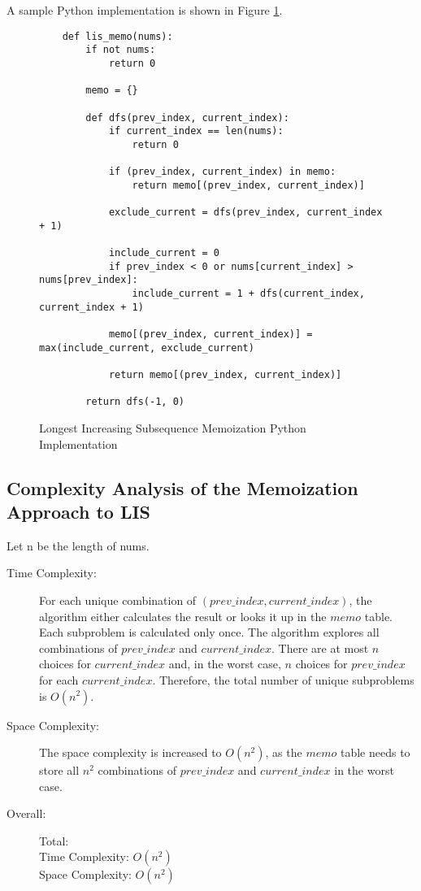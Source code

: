 A sample Python implementation is shown in Figure \ref{fig:lis-memo}.

\begin{figure}[H]
    \centering
    \begin{lstlisting}
    def lis_memo(nums):
        if not nums:
            return 0
    
        memo = {}
    
        def dfs(prev_index, current_index):
            if current_index == len(nums):
                return 0
    
            if (prev_index, current_index) in memo:
                return memo[(prev_index, current_index)]
            
            exclude_current = dfs(prev_index, current_index + 1)
    
            include_current = 0
            if prev_index < 0 or nums[current_index] > nums[prev_index]:
                include_current = 1 + dfs(current_index, current_index + 1)
    
            memo[(prev_index, current_index)] = max(include_current, exclude_current)
    
            return memo[(prev_index, current_index)]
    
        return dfs(-1, 0)
    \end{lstlisting}
    \caption{Longest Increasing Subsequence Memoization Python Implementation}
    \label{fig:lis-memo}
\end{figure}

\subsection{Complexity Analysis of the Memoization Approach to LIS}
Let n be the length of nums.
\begin{description}
    \item[Time Complexity:]
        For each unique combination of $(prev\_index, current\_index)$, the algorithm either calculates the result or looks it up in the $memo$ table.
        Each subproblem is calculated only once.
        The algorithm explores all combinations of $prev\_index$ and $current\_index$.
        There are at most $n$ choices for $current\_index$ and,
        in the worst case, $n$ choices for $prev\_index$ for each $current\_index$.
        Therefore, the total number of unique subproblems is $O(n^2)$.
        
    \item[Space Complexity:] 
        The space complexity is increased to $O(n^2)$,
        as the $memo$ table needs to store all $n^2$ combinations of $prev\_index$ and $current\_index$ in the worst case.
        
        
    \item[Overall:] Total:\\
        Time Complexity: $O(n^2)$\\
        Space Complexity: $O(n^2)$
    
\end{description}

